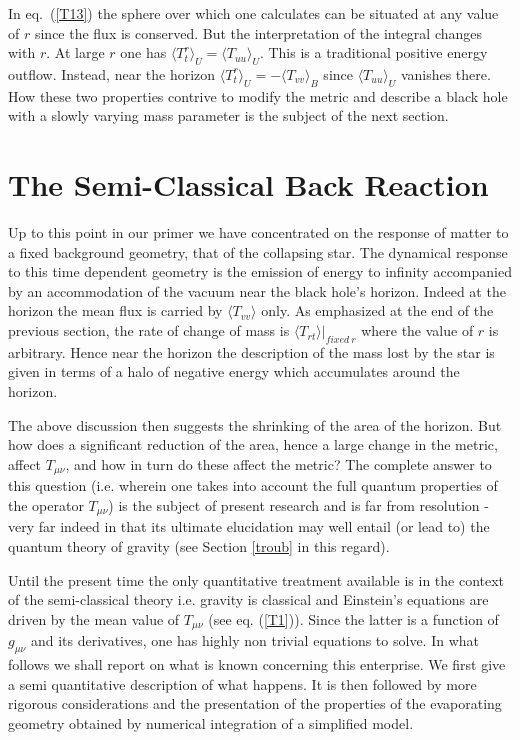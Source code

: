 \documentclass[12pt,oneside]{report}
\begin{document}
In eq.~(\ref{T13}) the sphere over which one calculates can be situated at any
value of $r$ since the flux is conserved.  But the interpretation of the
integral changes with $r$. At large $r$ one has $\langle T^r_t \rangle_U =
\langle T_{uu} \rangle_U  $. This is a traditional positive energy outflow.
Instead,  near the horizon $\langle T^r_t \rangle_U = -\langle T_{vv} \rangle_B
$ since $\langle T_{uu} \rangle_U $ vanishes there.  How these two properties
contrive to modify the metric and describe a black hole with a slowly varying
mass parameter is the subject of the next section.





\section{The Semi-Classical Back Reaction}\label{semicc}

Up to this point in our primer we have concentrated on the
response of matter to a fixed background geometry, that
of the collapsing star. The dynamical response to this
time dependent geometry is the emission of energy to
infinity accompanied by an accommodation of the vacuum
near the black hole's horizon. 
Indeed 	at the horizon the
mean flux is carried by $\langle T_{vv} \rangle$ only. As
emphasized at the end of the previous section, the rate of change
of mass  is $
\langle T_{rt} \rangle\vert_{fixed \ r}$ where the
value of $r$ is arbitrary.
 Hence near the horizon the
description of the mass lost by the star is given in
terms of a halo of negative energy which accumulates
around the horizon.

The above discussion then suggests the shrinking of the
area of the horizon. But how does a significant reduction of
the area, hence a large change in the metric, affect 
$T_{\mu\nu}$, and how in turn do these
affect the metric? The complete answer to this question
(i.e. wherein one takes into account the 
full quantum properties of the operator $T_{\mu\nu}$) is 
the subject of present research and is far from
resolution -very far indeed in that its ultimate
elucidation may well entail (or lead to) the quantum
theory of gravity (see Section \ref{troub} in this regard).

Until the present time the only quantitative treatment
available is in the context of the semi-classical theory
i.e. gravity is classical and Einstein's equations are
driven by the mean value of $T_{\mu\nu}$ 
(see eq. (\ref{T1})). Since the latter
is a function of $g_{\mu\nu}$ and its derivatives, one
has highly non trivial equations to solve. In what
follows we shall report on what is known concerning this
enterprise. We first give  a semi quantitative
description of what happens. It is then followed by
more rigorous considerations and the presentation of 
the properties of the evaporating geometry obtained by numerical 
integration
of a
simplified model.
\end{document}
